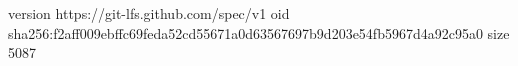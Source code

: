 version https://git-lfs.github.com/spec/v1
oid sha256:f2aff009ebffc69feda52cd55671a0d63567697b9d203e54fb5967d4a92c95a0
size 5087
